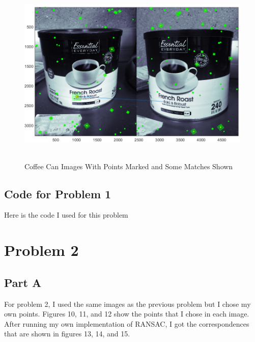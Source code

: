 \documentclass[11pt,psfig]{article}
\begin{document}
\begin{figure}[H]
\centering
\includegraphics[height=3.5in]{coffeeCan_pointsWithMatching.png}
\caption{Coffee Can Images With Points Marked and Some Matches Shown}
\label{cc3}
\end{figure}

\newpage

\subsection*{Code for Problem 1}

Here is the code I used for this problem



\newpage

\section*{Problem 2}

\subsection*{Part A}

For problem 2, I used the same images as the previous problem but I chose my own points. Figures 10, 11, and 12 show the points that I chose in each image. After running my own implementation of RANSAC, I got the correspondences that are shown in figures 13, 14, and 15.
\end{document}
